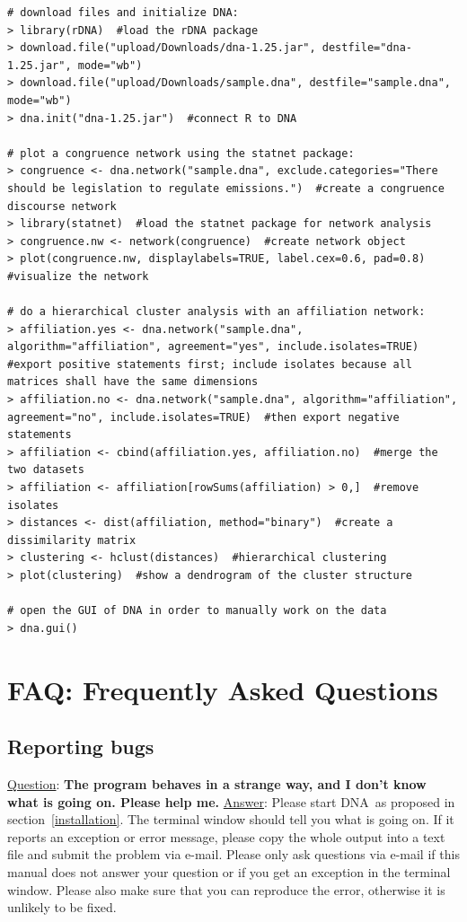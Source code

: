 \documentclass[12pt,a4paper]{scrreprt}
\newcommand{\dnashort}{\textsc{DNA}}
\begin{document}
\begin{lstlisting}[breaklines=true,showstringspaces=false,frame=tlRB]
# download files and initialize DNA:
> library(rDNA)  #load the rDNA package
> download.file("upload/Downloads/dna-1.25.jar", destfile="dna-1.25.jar", mode="wb")
> download.file("upload/Downloads/sample.dna", destfile="sample.dna", mode="wb")
> dna.init("dna-1.25.jar")  #connect R to DNA

# plot a congruence network using the statnet package:
> congruence <- dna.network("sample.dna", exclude.categories="There should be legislation to regulate emissions.")  #create a congruence discourse network
> library(statnet)  #load the statnet package for network analysis
> congruence.nw <- network(congruence)  #create network object
> plot(congruence.nw, displaylabels=TRUE, label.cex=0.6, pad=0.8)  #visualize the network

# do a hierarchical cluster analysis with an affiliation network:
> affiliation.yes <- dna.network("sample.dna", algorithm="affiliation", agreement="yes", include.isolates=TRUE)  #export positive statements first; include isolates because all matrices shall have the same dimensions
> affiliation.no <- dna.network("sample.dna", algorithm="affiliation", agreement="no", include.isolates=TRUE)  #then export negative statements
> affiliation <- cbind(affiliation.yes, affiliation.no)  #merge the two datasets
> affiliation <- affiliation[rowSums(affiliation) > 0,]  #remove isolates
> distances <- dist(affiliation, method="binary")  #create a dissimilarity matrix
> clustering <- hclust(distances)  #hierarchical clustering
> plot(clustering)  #show a dendrogram of the cluster structure

# open the GUI of DNA in order to manually work on the data
> dna.gui()
\end{lstlisting}

\chapter{FAQ: Frequently Asked Questions}\label{faq}

\section{Reporting bugs}
\underline{Question}: \textbf{The program behaves in a strange way, and I don't know what is going on. Please help me.}
\vspace{0.3cm} \newline
\underline{Answer}: Please start \dnashort\ as proposed in section~\ref{installation}. The terminal window should tell you what is going on. If it reports an exception or error message, please copy the whole output into a text file and submit the problem via e-mail. Please only ask questions via e-mail if this manual does not answer your question or if you get an exception in the terminal window. Please also make sure that you can reproduce the error, otherwise it is unlikely to be fixed.
\end{document}
